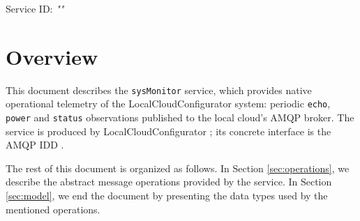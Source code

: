 \documentclass[a4paper]{arrowhead}
\begin{document}
\sloppy

\ArrowheadSetup

\begin{center}
  \vspace*{1cm}
  \huge{\arrowtitle}

  \vspace*{0.2cm}
  \LARGE{\arrowtype}
  \vspace*{1cm}

  \Large{Service ID: \textit{"\arrowid"}}

  \vspace*{\fill}


  \vspace*{1cm}
  \vspace*{\fill}

  \begin{abstract}
    This document describes the native \texttt{sysMonitor} service, version 1.0.0, produced by the LocalCloudConfigurator support system of Arrowhead 5.2.2.
  \end{abstract}

  \vspace*{1cm}
\end{center}

\newpage

\tableofcontents
\newpage

\section{Overview}
\label{sec:overview}

This document describes the \texttt{sysMonitor} service, which provides native operational telemetry of the LocalCloudConfigurator system: periodic \texttt{echo}, \texttt{power} and \texttt{status} observations published to the local cloud's AMQP broker.
The service is produced by LocalCloudConfigurator \cite{lcc-sysd}; its concrete interface is the AMQP IDD \cite{lcc-sysMonitor-amqp-idd}.

The rest of this document is organized as follows.
In Section \ref{sec:operations}, we describe the abstract message operations provided by the service.
In Section \ref{sec:model}, we end the document by presenting the data types used by the mentioned operations.
\end{document}
